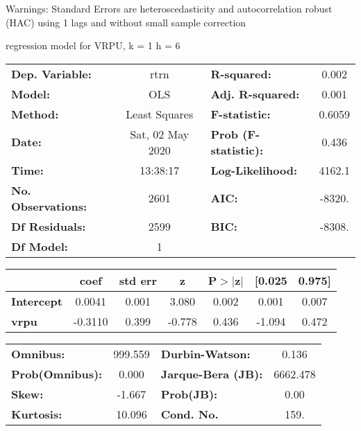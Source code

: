 Warnings: \newline
 [1] Standard Errors are heteroscedasticity and autocorrelation robust (HAC) using 1 lags and without small sample correction\ 

regression model for VRPU, k = 1 h = 6\begin{center}
\begin{tabular}{lclc}
\toprule
\textbf{Dep. Variable:}    &       rtrn       & \textbf{  R-squared:         } &     0.002   \\
\textbf{Model:}            &       OLS        & \textbf{  Adj. R-squared:    } &     0.001   \\
\textbf{Method:}           &  Least Squares   & \textbf{  F-statistic:       } &    0.6059   \\
\textbf{Date:}             & Sat, 02 May 2020 & \textbf{  Prob (F-statistic):} &    0.436    \\
\textbf{Time:}             &     13:38:17     & \textbf{  Log-Likelihood:    } &    4162.1   \\
\textbf{No. Observations:} &        2601      & \textbf{  AIC:               } &    -8320.   \\
\textbf{Df Residuals:}     &        2599      & \textbf{  BIC:               } &    -8308.   \\
\textbf{Df Model:}         &           1      & \textbf{                     } &             \\
\bottomrule
\end{tabular}
\begin{tabular}{lcccccc}
                   & \textbf{coef} & \textbf{std err} & \textbf{z} & \textbf{P$> |$z$|$} & \textbf{[0.025} & \textbf{0.975]}  \\
\midrule
\textbf{Intercept} &       0.0041  &        0.001     &     3.080  &         0.002        &        0.001    &        0.007     \\
\textbf{vrpu}      &      -0.3110  &        0.399     &    -0.778  &         0.436        &       -1.094    &        0.472     \\
\bottomrule
\end{tabular}
\begin{tabular}{lclc}
\textbf{Omnibus:}       & 999.559 & \textbf{  Durbin-Watson:     } &    0.136  \\
\textbf{Prob(Omnibus):} &   0.000 & \textbf{  Jarque-Bera (JB):  } & 6662.478  \\
\textbf{Skew:}          &  -1.667 & \textbf{  Prob(JB):          } &     0.00  \\
\textbf{Kurtosis:}      &  10.096 & \textbf{  Cond. No.          } &     159.  \\
\bottomrule
\end{tabular}
\end{center}

